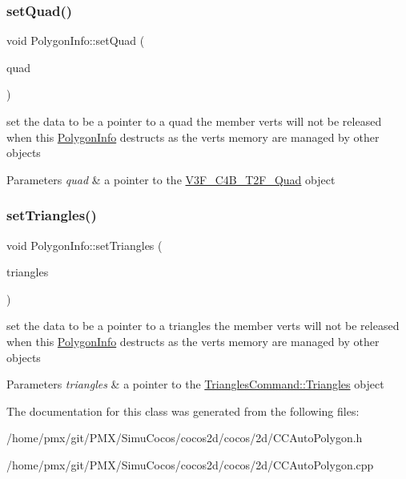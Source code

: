 \subsubsection{\texorpdfstring{set\+Quad()}{setQuad()}}
{\footnotesize\ttfamily void Polygon\+Info\+::set\+Quad (\begin{DoxyParamCaption}\item[{\hyperlink{structV3F__C4B__T2F__Quad}{V3\+F\+\_\+\+C4\+B\+\_\+\+T2\+F\+\_\+\+Quad} $\ast$}]{quad }\end{DoxyParamCaption})}

set the data to be a pointer to a quad the member verts will not be released when this \hyperlink{classPolygonInfo}{Polygon\+Info} destructs as the verts memory are managed by other objects 
\begin{DoxyParams}{Parameters}
{\em quad} & a pointer to the \hyperlink{structV3F__C4B__T2F__Quad}{V3\+F\+\_\+\+C4\+B\+\_\+\+T2\+F\+\_\+\+Quad} object \\
\hline
\end{DoxyParams}
\mbox{\label{classPolygonInfo_ga0fd028d854bdb30347161b5d816743a4}} 
\subsubsection{\texorpdfstring{set\+Triangles()}{setTriangles()}}
{\footnotesize\ttfamily void Polygon\+Info\+::set\+Triangles (\begin{DoxyParamCaption}\item[{const \hyperlink{structTrianglesCommand_1_1Triangles}{Triangles\+Command\+::\+Triangles} \&}]{triangles }\end{DoxyParamCaption})}

set the data to be a pointer to a triangles the member verts will not be released when this \hyperlink{classPolygonInfo}{Polygon\+Info} destructs as the verts memory are managed by other objects 
\begin{DoxyParams}{Parameters}
{\em triangles} & a pointer to the \hyperlink{structTrianglesCommand_1_1Triangles}{Triangles\+Command\+::\+Triangles} object \\
\hline
\end{DoxyParams}


The documentation for this class was generated from the following files\+:\begin{DoxyCompactItemize}
\item 
/home/pmx/git/\+P\+M\+X/\+Simu\+Cocos/cocos2d/cocos/2d/C\+C\+Auto\+Polygon.\+h\item 
/home/pmx/git/\+P\+M\+X/\+Simu\+Cocos/cocos2d/cocos/2d/C\+C\+Auto\+Polygon.\+cpp\end{DoxyCompactItemize}
